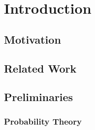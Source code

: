 \chapter{Introduction}

\section{Motivation}


\section{Related Work}


\section{Preliminaries}


\subsection{Probability Theory}

